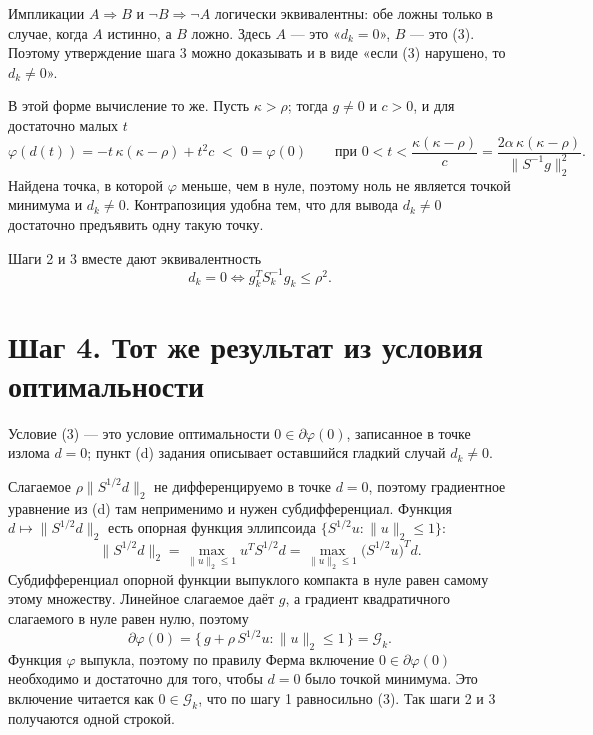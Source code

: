 \documentclass[11pt,a4paper]{article}
\newcommand{\G}{\mathcal{G}_k}
\newcommand{\Shalf}{S^{1/2}}
\newcommand{\norm}[1]{\lVert #1\rVert_2}
\begin{document}
Импликации $A \Rightarrow B$ и $\neg B \Rightarrow \neg A$ логически эквивалентны:
обе ложны только в случае, когда $A$ истинно, а $B$ ложно. Здесь $A$ — это
«$d_k = 0$», $B$ — это (3). Поэтому утверждение шага 3 можно доказывать и в виде
«если (3) нарушено, то $d_k \ne 0$».

В этой форме вычисление то же. Пусть $\kappa > \rho$; тогда $g \ne 0$ и $c > 0$,
и для достаточно малых $t$
\begin{equation*}
\varphi(d(t)) = -t\,\kappa(\kappa-\rho) + t^2c \;<\; 0 = \varphi(0)
\qquad \text{при } 0 < t < \frac{\kappa(\kappa-\rho)}{c}
= \frac{2\alpha\,\kappa(\kappa-\rho)}{\norm{S^{-1}g}^2}.
\end{equation*}
Найдена точка, в которой $\varphi$ меньше, чем в нуле, поэтому ноль не является
точкой минимума и \mbox{$d_k \ne 0$}. Контрапозиция удобна тем, что для вывода
$d_k \ne 0$ достаточно предъявить одну такую точку.

Шаги 2 и 3 вместе дают эквивалентность
\begin{equation*}
d_k = 0 \iff g_k^TS_k^{-1}g_k \le \rho^2 .
\end{equation*}

\section*{Шаг 4. Тот же результат из условия оптимальности}

Условие (3) — это условие оптимальности $0 \in \partial\varphi(0)$, записанное в
точке излома $d = 0$; пункт (d) задания описывает оставшийся гладкий случай
$d_k \ne 0$.

Слагаемое $\rho\norm{\Shalf d}$ не дифференцируемо в точке $d = 0$, поэтому
градиентное уравнение из (d) там неприменимо и нужен субдифференциал. Функция
$d \mapsto \norm{\Shalf d}$ есть опорная функция эллипсоида
$\{\Shalf u : \norm{u} \le 1\}$:
\begin{equation*}
\norm{\Shalf d} = \max_{\norm{u}\le 1} u^T\Shalf d
= \max_{\norm{u}\le 1} \big(\Shalf u\big)^Td .
\end{equation*}
Субдифференциал опорной функции выпуклого компакта в нуле равен самому этому
множеству. Линейное слагаемое даёт $g$, а градиент квадратичного слагаемого в нуле
равен нулю, поэтому
\begin{equation*}
\partial\varphi(0) = \big\{\,g + \rho\,\Shalf u : \norm{u} \le 1\,\big\} = \G .
\end{equation*}
Функция $\varphi$ выпукла, поэтому по правилу Ферма включение
$0 \in \partial\varphi(0)$ необходимо и достаточно для того, чтобы $d = 0$ было
точкой минимума. Это включение читается как $0 \in \G$, что по шагу 1 равносильно
(3). Так шаги 2 и 3 получаются одной строкой.
\end{document}
